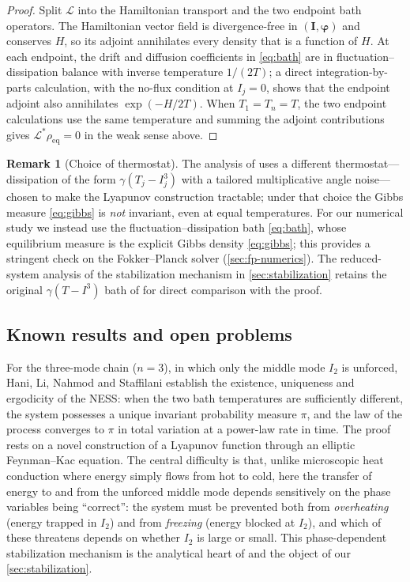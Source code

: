 \documentclass[11pt,a4paper]{article}
\theoremstyle{definition}
\newtheorem{remark}[theorem]{Remark}
\numberwithin{equation}{section}   %
\newcommand{\bI}{\mathbf{I}}
\newcommand{\bphi}{\boldsymbol{\varphi}}
\newcommand{\Lgen}{\mathcal{L}}
\newcommand{\Ladj}{\mathcal{L}^{*}}
\begin{document}
\begin{proof}
Split $\Lgen$ into the Hamiltonian transport and the two endpoint bath
operators. The Hamiltonian vector field is divergence-free in
$(\bI,\bphi)$ and conserves $H$, so its adjoint annihilates every density that
is a function of $H$. At each endpoint, the drift and diffusion coefficients in
\eqref{eq:bath} are in fluctuation--dissipation balance with inverse
temperature $1/(2T)$; a direct integration-by-parts calculation, with the
no-flux condition at $I_j=0$, shows that the endpoint adjoint also annihilates
$\exp(-H/2T)$. When $T_1=T_n=T$, the two endpoint calculations use the same
temperature and summing the adjoint contributions gives
$\Ladj\rho_{\mathrm{eq}}=0$ in the weak sense above.
\end{proof}

\begin{remark}[Choice of thermostat]\label{rem:bath}
The analysis of \cite{HLNS} uses a different thermostat---dissipation of the form
$\gamma(T_j-I_j^3)$ with a tailored multiplicative angle noise---chosen to make
the Lyapunov construction tractable; under that choice the Gibbs measure
\eqref{eq:gibbs} is \emph{not} invariant, even at equal temperatures. For our
numerical study we instead use the fluctuation--dissipation bath
\eqref{eq:bath}, whose equilibrium measure is the explicit Gibbs density
\eqref{eq:gibbs}; this provides a stringent check on the Fokker--Planck solver
(\cref{sec:fp-numerics}). The reduced-system analysis of the stabilization
mechanism in \cref{sec:stabilization} retains the original $\gamma(T-I^3)$ bath
of \cite{HLNS} for direct comparison with the proof.
\end{remark}

\subsection{Known results and open problems}\label{sec:known}

For the three-mode chain ($n=3$), in which only the middle mode $I_2$ is
unforced, Hani, Li, Nahmod and Staffilani \cite{HLNS} establish the existence,
uniqueness and ergodicity of the NESS: when the two bath temperatures are
sufficiently different, the system possesses a unique invariant probability
measure $\pi$, and the law of the process converges to $\pi$ in total variation
at a power-law rate in time. The proof rests on a novel construction of a
Lyapunov function through an elliptic Feynman--Kac equation. The central
difficulty is that, unlike microscopic heat conduction where energy simply flows
from hot to cold, here the transfer of energy to and from the unforced middle
mode depends sensitively on the phase variables being ``correct'': the system
must be prevented both from \emph{overheating} (energy trapped in $I_2$) and from
\emph{freezing} (energy blocked at $I_2$), and which of these threatens depends on
whether $I_2$ is large or small. This phase-dependent stabilization mechanism is
the analytical heart of \cite{HLNS} and the object of our \cref{sec:stabilization}.
\end{document}
